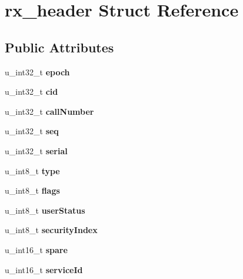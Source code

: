 \hypertarget{structrx__header}{
\section{rx\_\-header Struct Reference}
\label{structrx__header}
}
\subsection*{Public Attributes}
\begin{DoxyCompactItemize}
\item 
\hypertarget{structrx__header_aa99c64b24cf64d2426f272ec2025648e}{
u\_\-int32\_\-t {\bfseries epoch}}
\label{structrx__header_aa99c64b24cf64d2426f272ec2025648e}

\item 
\hypertarget{structrx__header_ab25212872b7dde5c43239721f70e36cf}{
u\_\-int32\_\-t {\bfseries cid}}
\label{structrx__header_ab25212872b7dde5c43239721f70e36cf}

\item 
\hypertarget{structrx__header_a397404563f4e31de4ba515afef1716a6}{
u\_\-int32\_\-t {\bfseries callNumber}}
\label{structrx__header_a397404563f4e31de4ba515afef1716a6}

\item 
\hypertarget{structrx__header_a04beb059806dee0e5ad442b29db89a36}{
u\_\-int32\_\-t {\bfseries seq}}
\label{structrx__header_a04beb059806dee0e5ad442b29db89a36}

\item 
\hypertarget{structrx__header_ac17d6ddc1acf2c7d5c0dc558ebdacd04}{
u\_\-int32\_\-t {\bfseries serial}}
\label{structrx__header_ac17d6ddc1acf2c7d5c0dc558ebdacd04}

\item 
\hypertarget{structrx__header_a2aad6d30b9327bbbb018c7fb1cfff74b}{
u\_\-int8\_\-t {\bfseries type}}
\label{structrx__header_a2aad6d30b9327bbbb018c7fb1cfff74b}

\item 
\hypertarget{structrx__header_a278ea982ab2a002e5097fd96945d4734}{
u\_\-int8\_\-t {\bfseries flags}}
\label{structrx__header_a278ea982ab2a002e5097fd96945d4734}

\item 
\hypertarget{structrx__header_ab0e9a802d648f3c9c8ada9d41b8787f5}{
u\_\-int8\_\-t {\bfseries userStatus}}
\label{structrx__header_ab0e9a802d648f3c9c8ada9d41b8787f5}

\item 
\hypertarget{structrx__header_a179874f614250879e3225ff258978181}{
u\_\-int8\_\-t {\bfseries securityIndex}}
\label{structrx__header_a179874f614250879e3225ff258978181}

\item 
\hypertarget{structrx__header_ad5efe4e1b4951aba63861543a2894310}{
u\_\-int16\_\-t {\bfseries spare}}
\label{structrx__header_ad5efe4e1b4951aba63861543a2894310}

\item 
\hypertarget{structrx__header_ae78197f576afb1897d3aaface8b4fe53}{
u\_\-int16\_\-t {\bfseries serviceId}}
\label{structrx__header_ae78197f576afb1897d3aaface8b4fe53}

\end{DoxyCompactItemize}
